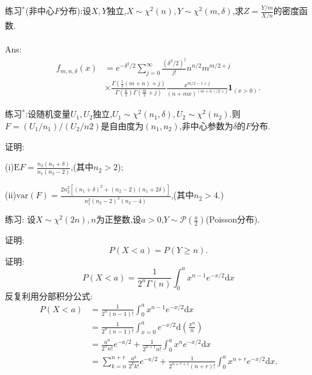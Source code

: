 	\begin{frame}
		练习$^*$(非中心$F$分布):设$X,Y$独立,$X\sim\chi^2(n),Y\sim\chi^2(m,\delta)$,求$Z=\frac{Y/m}{X/n}$的密度函数.
		\\ \hspace*{\fill} \\%
		Ans:
		\begin{equation}
			\begin{split}
				f_{m,n,\delta}(x) &= e^{-\delta^2/2}\sum_{j=0}^{\infty}\frac{(\delta^2/2)^j}{j!}n^{n/2}m^{m/2+j} \\
				&\times \frac{\Gamma(\frac{1}{2}(m+n)+j)}{\Gamma(\frac{n}{2})\Gamma(\frac{m}{2}+j)}
				\frac{x^{m/2-1+j}}{(n+mx)^{(m+n)/2+j}}\bm{1}_{(x>0)}.
			\end{split}
		\end{equation}
	\end{frame}
		
	\begin{frame}
		练习$^*$:设随机变量$U_1,U_2$独立,$U_1\sim\chi^2(n_1,\delta),U_2\sim\chi^2(n_2)$.则$F=(U_1/n_1)/(U_2/n2)$是自由度为$(n_1,n_2)$,非中心参数为$\delta$的$F$分布.
		
		证明:
		
		(i)$\mathrm{E}F = \frac{n_2(n_1+\delta)}{n_1(n_2-2)}$,(其中$n_2>2$);
		
		(ii)$\mathrm{var}(F) = \frac{2n_2^2\left[(n_1+\delta)^2+(n_2-2)(n_1+2\delta)\right]}{n_1^2(n_2-2)^2(n_2-4)}$,(其中$n_2>4$.)
	\end{frame}

	\begin{frame}
		练习: 设$X\sim\chi^2(2n),n$为正整数,设$a>0$,$Y\sim\mathcal{P}(\frac{a}{2})$(Poisson分布).
		
		证明:
		\begin{equation}
			P(X<a) = P(Y\geqslant n).
		\end{equation}
		证明: \begin{equation}
			P(X<a) = \frac{1}{2^n\Gamma(n)}\int_{0}^{a}x^{n-1}e^{-x/2}\mathrm{d}x
		\end{equation}
		反复利用分部积分公式:
		\begin{equation}
			\begin{split}
				P(X<a) &= \frac{1}{2^n(n-1)!}\int_{0}^{a}x^{n-1}e^{-x/2}\mathrm{d}x \\
				&= \frac{1}{2^n(n-1)!}\int_{x=0}^{a}e^{-x/2}\mathrm{d}\left(\frac{x^n}{n}\right) \\
				&= \frac{a^n}{2^nn!}e^{-a/2}+\frac{1}{2^{n+1}n!}\int_{0}^{a}x^{n}e^{-x/2}\mathrm{d}x \\
				&= \sum_{k=n}^{n+r}\frac{a^k}{2^kk!}e^{-a/2}+\frac{1}{2^{n+r+1}(n+r)!}\int_{0}^{a}x^{n+r}e^{-x/2}\mathrm{d}x.
			\end{split}
		\end{equation}
	\end{frame}

